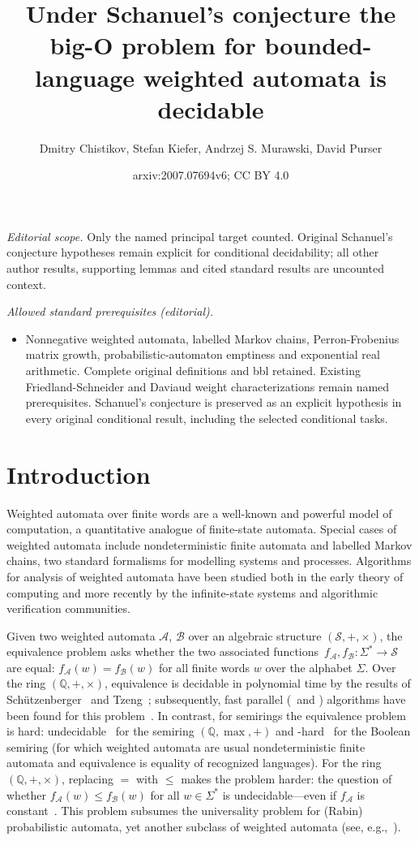 \documentclass[10pt,a4paper]{amsart}
\title{Under Schanuel's conjecture the big-O problem for bounded-language weighted automata is decidable}
\author{Dmitry Chistikov, Stefan Kiefer, Andrzej S. Murawski, David Purser}
\date{arxiv:2007.07694v6; CC BY 4.0}
\numberwithin{equation}{section}
\theoremstyle{plain}
\theoremstyle{definition}
\theoremstyle{remark}
\begin{document}
\maketitle
\noindent\textit{Editorial scope.} Only the named principal target counted. Original Schanuel's conjecture hypotheses remain explicit for conditional decidability; all other author results, supporting lemmas and cited standard results are uncounted context.\par\medskip
\noindent\textit{Allowed standard prerequisites (editorial).}\begin{itemize}
\item Nonnegative weighted automata, labelled Markov chains, Perron-Frobenius matrix growth, probabilistic-automaton emptiness and exponential real arithmetic. Complete original definitions and bbl retained. Existing Friedland-Schneider and Daviaud weight characterizations remain named prerequisites. Schanuel's conjecture is preserved as an explicit hypothesis in every original conditional result, including the selected conditional tasks.
\end{itemize}\medskip
\section{Introduction}\label{sec:intro}

Weighted automata over finite words
are a well-known and powerful model of computation,
a quantitative analogue of finite-state automata.
Special cases of weighted automata include
nondeterministic finite automata
and labelled Markov chains, two standard formalisms for modelling systems
and processes.
Algorithms for analysis of weighted automata have been studied
both in the early theory of computing and
more recently by the infinite-state systems and algorithmic verification
communities.

Given two weighted automata $\mathcal A$, $\mathcal B$
over an algebraic structure $(\mathcal S, {+}, {\times})$,
the equivalence problem asks whether the two associated functions~$f_{\mathcal A}, f_{\mathcal B} \colon \Sigma^* \to \mathcal S$
are equal: $f_{\mathcal A}(w) = f_{\mathcal B}(w)$ for all finite
words $w$ over the alphabet $\Sigma$.
Over the ring $(\mathbb Q, {+}, {\times})$,
equivalence
is decidable in polynomial time by the results of
Sch\"utzenberger~\cite{schutzenberger1961definition} and Tzeng~\cite{tzeng1992polynomial};
subsequently, fast parallel (\NC\ and \RNC) algorithms have been found
for this problem~\cite{Tzeng96,kiefer2013complexity}.
In contrast, for semirings the equivalence problem is hard:
undecidable~\cite{Krob94,AlmagorBK11} for the semiring $(\mathbb Q, {\max}, {+})$
and \PSPACE-hard~\cite{MS72} for the Boolean semiring
(for which weighted automata are usual nondeterministic finite automata
 and equivalence is equality of recognized languages).
For the ring $(\mathbb Q, {+}, {\times})$, replacing $=$ with $\le$ makes the problem harder:
the question of whether $f_{\mathcal A}(w) \le f_{\mathcal B}(w)$
for all $w \in \Sigma^*$ is undecidable---even if $f_{\mathcal A}$ is constant~\cite{paz2014introduction}.
This problem subsumes the universality problem for (Rabin) probabilistic automata,
yet another subclass of weighted automata (see, e.g.,~\cite{fijalkow2017undecidability}).
\end{document}
